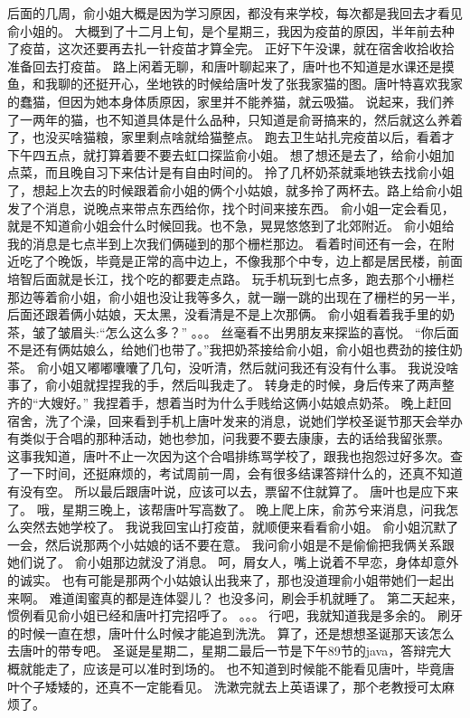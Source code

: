 后面的几周，俞小姐大概是因为学习原因，都没有来学校，每次都是我回去才看见俞小姐的。
大概到了十二月上旬，是个星期三，我因为疫苗的原因，半年前去种了疫苗，这次还要再去扎一针疫苗才算全完。
正好下午没课，就在宿舍收拾收拾准备回去打疫苗。
路上闲着无聊，和唐叶聊起来了，唐叶也不知道是水课还是摸鱼，和我聊的还挺开心，坐地铁的时候给唐叶发了张我家猫的图。唐叶特喜欢我家的蠢猫，但因为她本身体质原因，家里并不能养猫，就云吸猫。
说起来，我们养了一两年的猫，也不知道具体是什么品种，只知道是俞哥搞来的，然后就这么养着了，也没买啥猫粮，家里剩点啥就给猫整点。
跑去卫生站扎完疫苗以后，看着才下午四五点，就打算着要不要去虹口探监俞小姐。
想了想还是去了，给俞小姐加点菜，而且晚自习下来估计是有自由时间的。
拎了几杯奶茶就乘地铁去找俞小姐了，想起上次去的时候跟着俞小姐的俩个小姑娘，就多拎了两杯去。路上给俞小姐发了个消息，说晚点来带点东西给你，找个时间来接东西。
俞小姐一定会看见，就是不知道俞小姐会什么时候回我。也不急，晃晃悠悠到了北郊附近。
俞小姐给我的消息是七点半到上次我们俩碰到的那个栅栏那边。
看着时间还有一会，在附近吃了个晚饭，毕竟是正常的高中边上，不像我那个中专，边上都是居民楼，前面培智后面就是长江，找个吃的都要走点路。
玩手机玩到七点多，跑去那个小栅栏那边等着俞小姐，俞小姐也没让我等多久，就一蹦一跳的出现在了栅栏的另一半，后面还跟着俩小姑娘，天太黑，没看清是不是上次那俩。
俞小姐看着我手里的奶茶，皱了皱眉头:“怎么这么多？”
。。。
丝毫看不出男朋友来探监的喜悦。
“你后面不是还有俩姑娘么，给她们也带了。”我把奶茶接给俞小姐，俞小姐也费劲的接住奶茶。
俞小姐又嘟嘟囔囔了几句，没听清，然后就问我还有没有什么事。
我说没啥事了，俞小姐就捏捏我的手，然后叫我走了。
转身走的时候，身后传来了两声整齐的“大嫂好。”
我捏着手，想着当时为什么手贱给这俩小姑娘点奶茶。
晚上赶回宿舍，洗了个澡，回来看到手机上唐叶发来的消息，说她们学校圣诞节那天会举办有类似于合唱的那种活动，她也参加，问我要不要去康康，去的话给我留张票。
这事我知道，唐叶不止一次因为这个合唱排练骂学校了，跟我也抱怨过好多次。查了一下时间，还挺麻烦的，考试周前一周，会有很多结课答辩什么的，还真不知道有没有空。
所以最后跟唐叶说，应该可以去，票留不住就算了。
唐叶也是应下来了。
哦，星期三晚上，该帮唐叶写高数了。
晚上爬上床，俞苏兮来消息，问我怎么突然去她学校了。
我说我回宝山打疫苗，就顺便来看看俞小姐。
俞小姐沉默了一会，然后说那两个小姑娘的话不要在意。
我问俞小姐是不是偷偷把我俩关系跟她们说了。
俞小姐那边就没了消息。
呵，屑女人，嘴上说着不早恋，身体却意外的诚实。
也有可能是那两个小姑娘认出我来了，那也没道理俞小姐带她们一起出来啊。
难道闺蜜真的都是连体婴儿？
也没多问，刷会手机就睡了。
第二天起来，惯例看见俞小姐已经和唐叶打完招呼了。
。。。
行吧，我就知道我是多余的。
刷牙的时候一直在想，唐叶什么时候才能追到洗洗。
算了，还是想想圣诞那天该怎么去唐叶的带专吧。
圣诞是星期二，星期二最后一节是下午89节的java，答辩完大概就能走了，应该是可以准时到场的。
也不知道到时候能不能看见唐叶，毕竟唐叶个子矮矮的，还真不一定能看见。
洗漱完就去上英语课了，那个老教授可太麻烦了。

